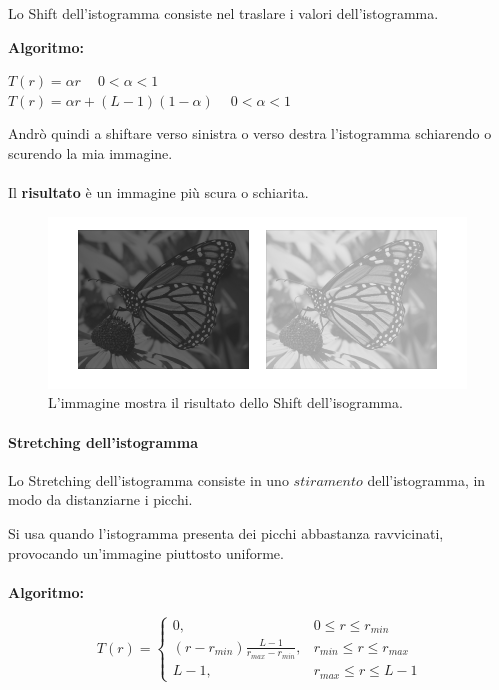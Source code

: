 \begin{definition}
    Lo Shift dell'istogramma consiste nel traslare i valori dell’istogramma.
\end{definition}
\textbf{Algoritmo:}

\begin{center}
    $T(r) = \alpha r$  $ \ \ \ \  0 < \alpha < 1$
    \\
    $T(r) = \alpha r + (L-1)(1-\alpha)$ $\ \ \ \ 0<\alpha<1$
\end{center}

Andrò quindi a shiftare verso sinistra o verso destra l'istogramma schiarendo o scurendo la mia immagine.
\\\\
Il \textbf{risultato} è un immagine più scura o schiarita.

\begin{figure}[H]
    \centering
    \includegraphics[width=\linewidth, keepaspectratio]{capitoli/immagini/imgs/shift-isto.png}
    \caption{L'immagine mostra il risultato dello Shift dell'isogramma.}
\end{figure}

\paragraph{Stretching dell'istogramma}

\begin{definition}
    Lo Stretching dell'istogramma consiste in uno $stiramento$ dell'istogramma, in modo da distanziarne i picchi.
\end{definition}

Si usa quando l'istogramma presenta dei picchi abbastanza ravvicinati, provocando un'immagine
piuttosto uniforme.
\\\\
\textbf{Algoritmo:}

$$
    T(r) =
    \begin{cases}
        0,                                         & 0 \le r \le r_{min}       \\
        (r - r_{min}) \frac{L-1}{r_{max}-r_{min}}, & r_{min} \le r \le r_{max} \\
        L-1,                                       & r_{max} \le r \le L-1
    \end{cases}
$$

